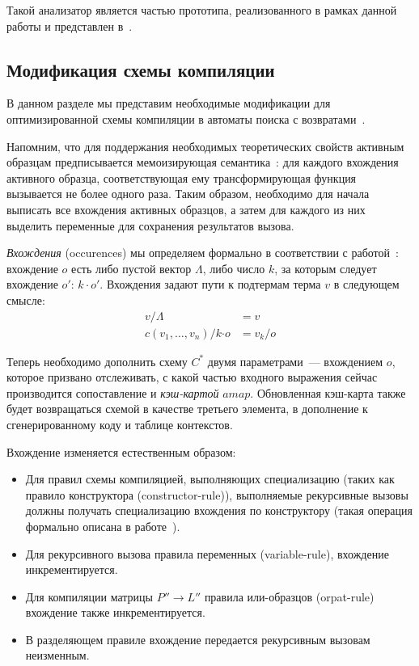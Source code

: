 Такой анализатор является частью прототипа, реализованного в рамках данной работы и представлен в~\cite{myrepo}.

\subsection{Модификация схемы компиляции}

В данном разделе мы представим необходимые модификации для оптимизированной схемы компиляции в автоматы поиска с возвратами~\cite{fessant2001optimizing}.

Напомним, что для поддержания необходимых теоретических свойств активным образцам предписывается мемоизирующая семантика~\cite{okasaki98views}: для каждого вхождения активного образца, соответствующая ему трансформирующая функция вызывается не более одного раза. Таким образом, необходимо для начала выписать все вхождения активных образцов, а затем для каждого из них выделить переменные для сохранения результатов вызова.

\textit{Вхождения} (occurences) мы определяем формально в соответствии с работой~\cite{maranget2008decisiontrees}: вхождение $o$ есть либо пустой вектор $\Lambda$, либо число $k$, за которым следует вхождение $o'$: $k \cdot o'$. Вхождения задают пути к подтермам терма $v$ в следующем смысле:
\begin{align*}
	v/\Lambda &= v  \\
	c(v_1,\ldots, v_n)/k \boldsymbol{\cdot} o &= v_k/o  
\end{align*}

Теперь необходимо дополнить схему $C^*$ двумя параметрами~--- вхождением $o$, которое призвано отслеживать, с какой частью входного выражения сейчас производится сопоставление и \textit{кэш-картой} $amap$. Обновленная кэш-карта также будет возвращаться схемой в качестве третьего элемента, в дополнение к сгенерированному коду и таблице контекстов.

Вхождение изменяется естественным образом: 

\begin{itemize}
\item Для правил схемы компиляцией, выполняющих специализацию (таких как правило конструктора (constructor-rule)), выполняемые рекурсивные вызовы должны получать специализацию вхождения по конструктору (такая операция формально описана в работе~\cite{maranget2008decisiontrees}).
\item Для рекурсивного вызова правила переменных (variable-rule), вхождение инкрементируется.
\item Для компиляции матрицы $P'' \to L''$ правила или-образцов (orpat-rule)~\cite{fessant2001optimizing} вхождение также инкрементируется.
\item В разделяющем правиле вхождение передается рекурсивным вызовам неизменным.
\end{itemize}

